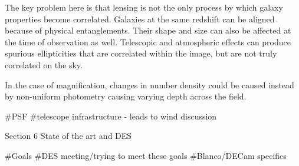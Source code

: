 The key problem here is that lensing is not the only process by which galaxy properties become correlated. Galaxies at the same redshift can be aligned because of physical entanglements. Their shape and size can also be affected at the time of observation as well. Telescopic and atmospheric effects can produce spurious ellipticities that are correlated within the image, but are not truly correlated on the sky.

In the case of magnification, changes in number density could be caused instead by non-uniform photometry causing varying depth across the field. 

#PSF
#telescope infrastructure - leads to wind discussion


Section 6
State of the art and DES

#Goals
#DES meeting/trying to meet these goals
#Blanco/DECam specifics
